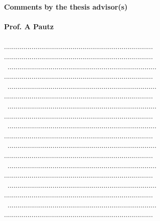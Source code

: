 \documentclass[11pt,titlepage]{article}
\begin{document}
\newpage
\noindent\textbf{Comments by the thesis advisor(s)}\\\\
\noindent\textbf{Prof. A Pautz}\\\\
............................................................................
............................................................................\\\
............................................................................
............................................................................\\\
............................................................................
............................................................................\\\
............................................................................
............................................................................\\\
............................................................................
............................................................................\\\
............................................................................
............................................................................\\\
............................................................................
............................................................................\\\
............................................................................
............................................................................\\\
............................................................................
............................................................................\\\
\end{document}
